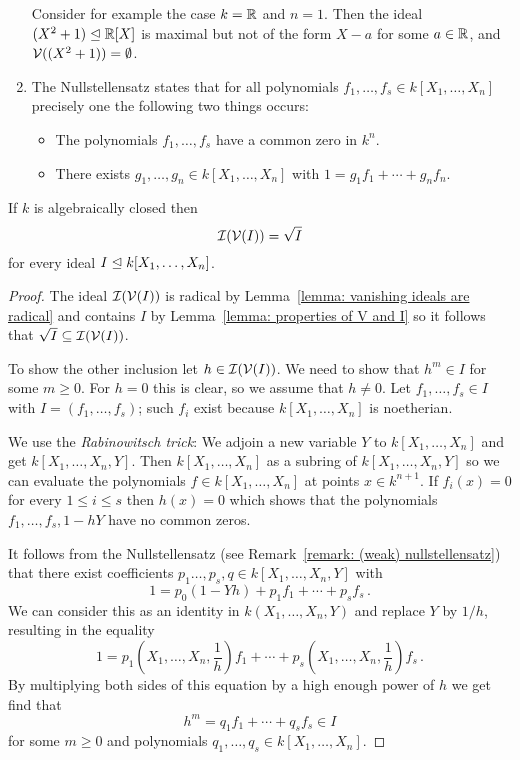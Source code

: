 \begin{remark}
\begin{enumerate}
      Consider for example the case $k = \mathbb{R}$ and $n = 1$.
      Then the ideal $(X^2 + 1) \trianglelefteq \mathbb{R}[X]$ is maximal but not of the form $X - a$ for some $a \in \mathbb{R}$, and $\mathcal{V}((X^2 + 1)) = \emptyset$.
    \item
      \label{enumerate: partition of unity formulation of NS}
      The Nullstellensatz states that for all polynomials $f_1, \dotsc, f_s \in k[X_1, \dotsc, X_n]$ precisely one the following two things occurs:
      \begin{itemize}
        \item
          The polynomials $f_1, \dotsc, f_s$ have a common zero in $k^n$.
        \item
          There exists $g_1, \dotsc, g_n \in k[X_1, \dotsc, X_n]$ with $1 = g_1 f_1 + \dotsb + g_n f_n$.
      \end{itemize}
  \end{enumerate}
\end{remark}


\begin{theorem}
  \label{theorem: strong nullstellensatz}
  If $k$ is algebraically closed then
  \[
      \mathcal{I}(\mathcal{V}(I))
    = \sqrt{I}
  \]
  for every ideal $I \trianglelefteq k[X_1, \dotsc, X_n]$.
\end{theorem}
\begin{proof}
  The ideal $\mathcal{I}(\mathcal{V}(I))$ is radical by Lemma~\ref{lemma: vanishing ideals are radical} and contains $I$ by Lemma~\ref{lemma: properties of V and I} so it follows that $\sqrt{I} \subseteq \mathcal{I}(\mathcal{V}(I))$.
  
  To show the other inclusion let $h \in \mathcal{I}(\mathcal{V}(I))$.
  We need to show that $h^m \in I$ for some $m \geq 0$.
  For $h = 0$ this is clear, so we assume that $h \neq 0$.
  Let $f_1, \dotsc, f_s \in I$ with $I = (f_1, \dotsc, f_s)$;
  such $f_i$ exist because  $k[X_1, \dotsc, X_n]$ is noetherian.
  
  We use the \emph{Rabinowitsch trick}:
  We adjoin a new variable $Y$ to $k[X_1, \dotsc, X_n]$ and get $k[X_1, \dotsc, X_n, Y]$.
  Then $k[X_1, \dotsc, X_n]$ as a subring of $k[X_1, \dotsc, X_n, Y]$ so we can evaluate the polynomials $f \in k[X_1, \dotsc, X_n]$ at points $x \in k^{n+1}$.
  If $f_i(x) = 0$ for every $1 \leq i \leq s$ then $h(x) = 0$ which shows that the polynomials $f_1, \dotsc, f_s, 1 - h Y$ have no common zeros.
  
  It follows from the Nullstellensatz (see Remark~\ref{remark: (weak) nullstellensatz}) that there exist coefficients $p_1 \ldots, p_s, q \in k[X_1, \dotsc, X_n, Y]$ with
  \[
      1
    = p_0 (1 - Y h) + p_1 f_1 + \dotsb + p_s f_s \,.
  \]
  We can consider this as an identity in $k(X_1, \dotsc, X_n, Y)$ and replace $Y$ by $1/h$, resulting in the equality
  \[
      1
    =   p_1 \left(X_1, \dotsc, X_n, \frac{1}{h} \right) f_1
      + \dotsb
      + p_s \left(X_1, \dotsc, X_n, \frac{1}{h} \right) f_s \,.
  \]
  By multiplying both sides of this equation by a high enough power of $h$ we get find that
  \[
        h^m
    =   q_1 f_1 + \dotsb + q_s f_s
    \in I
  \]
  for some $m \geq 0$ and polynomials $q_1, \dotsc, q_s \in k[X_1, \dotsc, X_n]$.
\end{proof}


